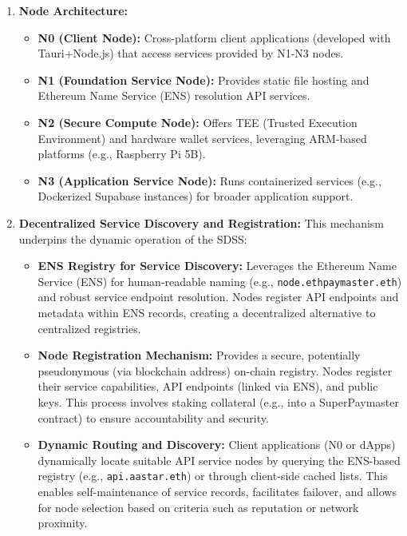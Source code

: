 \documentclass[preprint,12pt]{elsarticle}
\begin{document}
\begin{enumerate}
\item \textbf{Node Architecture:}
   \begin{itemize}
   \item \textbf{N0 (Client Node):} Cross-platform client applications (developed with Tauri+Node.js) that access services provided by N1-N3 nodes.
   \item \textbf{N1 (Foundation Service Node):} Provides static file hosting and Ethereum Name Service (ENS) resolution API services.
   \item \textbf{N2 (Secure Compute Node):} Offers TEE (Trusted Execution Environment) and hardware wallet services, leveraging ARM-based platforms (e.g., Raspberry Pi 5B).
   \item \textbf{N3 (Application Service Node):} Runs containerized services (e.g., Dockerized Supabase instances) for broader application support.
   \end{itemize}

\item \textbf{Decentralized Service Discovery and Registration:} This mechanism underpins the dynamic operation of the SDSS:
   \begin{itemize}
   \item \textbf{ENS Registry for Service Discovery:} Leverages the Ethereum Name Service (ENS) for human-readable naming (e.g., \texttt{node.ethpaymaster.eth}) and robust service endpoint resolution. Nodes register API endpoints and metadata within ENS records, creating a decentralized alternative to centralized registries.
   \item \textbf{Node Registration Mechanism:} Provides a secure, potentially pseudonymous (via blockchain address) on-chain registry. Nodes register their service capabilities, API endpoints (linked via ENS), and public keys. This process involves staking collateral (e.g., into a SuperPaymaster contract) to ensure accountability and security.
   \item \textbf{Dynamic Routing and Discovery:} Client applications (N0 or dApps) dynamically locate suitable API service nodes by querying the ENS-based registry (e.g., \texttt{api.aastar.eth}) or through client-side cached lists. This enables self-maintenance of service records, facilitates failover, and allows for node selection based on criteria such as reputation or network proximity.
   \end{itemize}
\end{enumerate}
\end{document}
